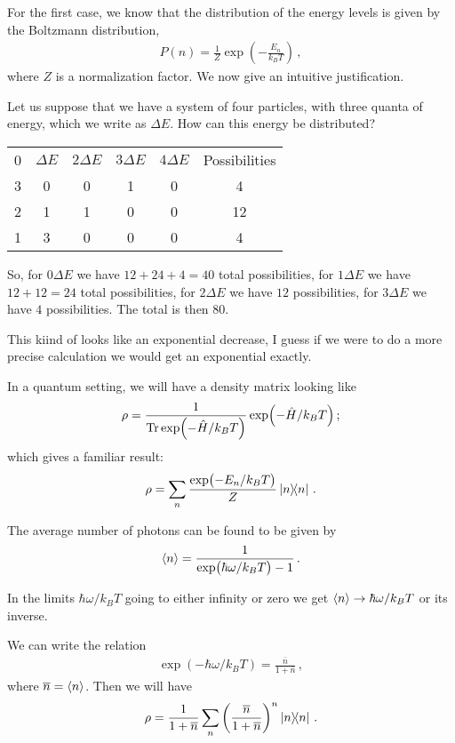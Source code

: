 \documentclass[main.tex]{subfiles}
\begin{document}
For the first case, we know that the distribution of the energy levels is given by the Boltzmann distribution,
%
\begin{align}
P(n) = \frac{1}{Z} \exp(- \frac{E_n}{k_B T})
\,,
\end{align}
%
where \(Z\) is a normalization factor. 
We now give an intuitive justification. 

Let us suppose that we have a system of four particles, with three quanta of energy, which we  write as \(\Delta E\). How can this energy be distributed? 

\begin{table}[h]
\centering
\begin{tabular}{ccccc|c}
0 & \(\Delta E\) & \(2 \Delta E\)& \(3 \Delta E\)& \(4 \Delta E\)  & Possibilities\\
3 & 0 & 0 & 1 & 0 & 4 \\
2 & 1 & 1 & 0 & 0 & 12  \\
1 & 3 & 0 & 0 & 0 & 4 
\end{tabular}
\end{table} 

So, for \(0 \Delta E\) we have \(12+24+4 = 40\) total possibilities, for \(1 \Delta E\) we have \(12 +12 = 24\) total possibilities, for \(2 \Delta E\) we have \(12\) possibilities, for \(3 \Delta E\) we have \(4\) possibilities. The total is then 80. 

This kiind of looks like an exponential decrease, I guess if we were to do a more precise calculation we would get an exponential exactly. 

In a quantum setting, we will have a density matrix looking like 
%
\begin{align}
\rho = \frac{1}{\tr \exp(- \hat{H} / k_B T)} \exp(- \hat{H} / k_B T)
\,;
\end{align}
%
which gives a familiar result: 
%
\begin{align}
\rho = \sum _{n} \frac{\exp(- E_n / k_B T)}{Z} \dyad{n} 
\,.
\end{align}

The average number of photons can be found to be given by 
%
\begin{align}
\expval{n} = \frac{1}{\exp(\hbar \omega / k_B T) - 1}
\,.
\end{align}

In the limits \(\hbar \omega / k_B T\) going to either infinity or zero we get \(\expval{n} \rightarrow \hbar \omega / k_B T\) or its inverse. 

We can write the relation 
%
\begin{align}
\exp(- \hbar \omega /k_B T) = \frac{\overline{n}}{1 + \overline{n}
}
\,,
\end{align}
%
where \(\overline{n} = \expval{n}\). Then we will have 
%
\begin{align}
\rho = \frac{1}{1 + \overline{n}} \sum _{n} \qty(\frac{\overline{n}}{1 + \overline{n}})^{n} \dyad{n} 
\,.
\end{align}
\end{document}

